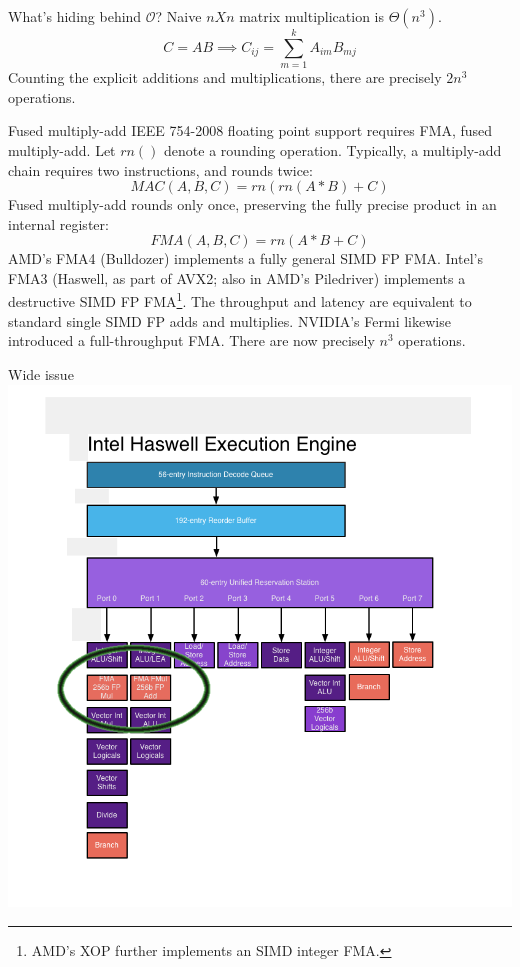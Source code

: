 \documentclass[mathserif,xcolor={dvipsnames,table}]{beamer}
\begin{document}
\begin{frame}{What's hiding behind $\mathcal{O}$?}
Naive $nXn$ matrix multiplication is $\Theta(n^{3})$.
\vfill
\begin{equation}
C = AB \implies C_{ij} = \sum\limits_{m=1}^{k} A_{im}B_{mj}
\end{equation}
\vfill
Counting the explicit additions and multiplications, there are
precisely $2n^{3}$ operations.
\end{frame}


\begin{frame}{Fused multiply-add}
\small{
IEEE 754-2008 floating point support requires FMA, fused multiply-add.
Let $rn()$ denote a rounding operation. Typically, a multiply-add chain
requires two instructions, and rounds twice:
\begin{equation}
MAC(A,B,C) = rn(rn(A * B) + C)
\end{equation}
Fused multiply-add rounds only once, preserving the fully precise product in
an internal register:
\begin{equation}
FMA(A,B,C) = rn(A * B + C)
\end{equation}
AMD's FMA4 (Bulldozer) implements a fully general SIMD FP FMA. Intel's FMA3
(Haswell, as part of AVX2; also in AMD's Piledriver) implements a destructive
SIMD FP FMA\footnote{AMD's XOP further implements an SIMD integer FMA.}.
The throughput and latency are equivalent to standard single SIMD FP adds and
multiplies. NVIDIA's Fermi likewise introduced a full-throughput FMA.
\vfill
There are now precisely $n^{3}$ operations.
}
\end{frame}

\begin{frame}{Wide issue}
\includegraphics[scale=.33]{images/haswellexec.png}
\end{frame}
\end{document}
